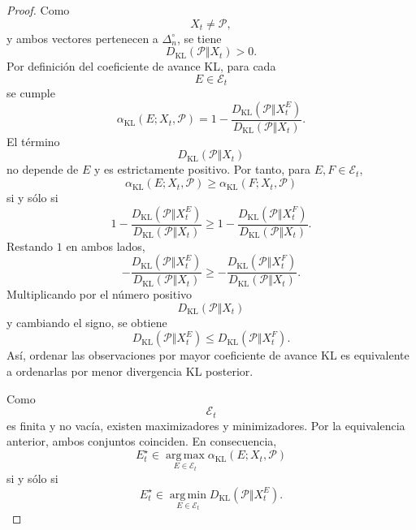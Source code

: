 \documentclass[12pt]{article}
\begin{document}
\begin{proof}
Como
\[
X_t\neq \mathcal P,
\]
y ambos vectores pertenecen a \(\Delta_n^\circ\), se tiene
\[
D_{\mathrm{KL}}(\mathcal P\Vert X_t)>0.
\]
Por definición del coeficiente de avance KL, para cada
\[
E\in\mathcal E_t
\]
se cumple
\[
\alpha_{\mathrm{KL}}(E;X_t,\mathcal P)
=
1-
\frac{
D_{\mathrm{KL}}(\mathcal P\Vert X_t^E)
}{
D_{\mathrm{KL}}(\mathcal P\Vert X_t)
}.
\]
El término
\[
D_{\mathrm{KL}}(\mathcal P\Vert X_t)
\]
no depende de \(E\) y es estrictamente positivo. Por tanto, para \(E,F\in\mathcal E_t\),
\[
\alpha_{\mathrm{KL}}(E;X_t,\mathcal P)
\geq
\alpha_{\mathrm{KL}}(F;X_t,\mathcal P)
\]
si y sólo si
\[
1-
\frac{
D_{\mathrm{KL}}(\mathcal P\Vert X_t^E)
}{
D_{\mathrm{KL}}(\mathcal P\Vert X_t)
}
\geq
1-
\frac{
D_{\mathrm{KL}}(\mathcal P\Vert X_t^F)
}{
D_{\mathrm{KL}}(\mathcal P\Vert X_t)
}.
\]
Restando \(1\) en ambos lados,
\[
-
\frac{
D_{\mathrm{KL}}(\mathcal P\Vert X_t^E)
}{
D_{\mathrm{KL}}(\mathcal P\Vert X_t)
}
\geq
-
\frac{
D_{\mathrm{KL}}(\mathcal P\Vert X_t^F)
}{
D_{\mathrm{KL}}(\mathcal P\Vert X_t)
}.
\]
Multiplicando por el número positivo
\[
D_{\mathrm{KL}}(\mathcal P\Vert X_t)
\]
y cambiando el signo, se obtiene
\[
D_{\mathrm{KL}}(\mathcal P\Vert X_t^E)
\leq
D_{\mathrm{KL}}(\mathcal P\Vert X_t^F).
\]
Así, ordenar las observaciones por mayor coeficiente de avance KL es equivalente a ordenarlas por menor divergencia KL posterior.

Como
\[
\mathcal E_t
\]
es finita y no vacía, existen maximizadores y minimizadores. Por la equivalencia anterior, ambos conjuntos coinciden. En consecuencia,
\[
E_t^\star
\in
\operatorname*{arg\,max}_{E\in\mathcal E_t}
\alpha_{\mathrm{KL}}(E;X_t,\mathcal P)
\]
si y sólo si
\[
E_t^\star
\in
\operatorname*{arg\,min}_{E\in\mathcal E_t}
D_{\mathrm{KL}}(\mathcal P\Vert X_t^E).
\]
\end{proof}
\end{document}
